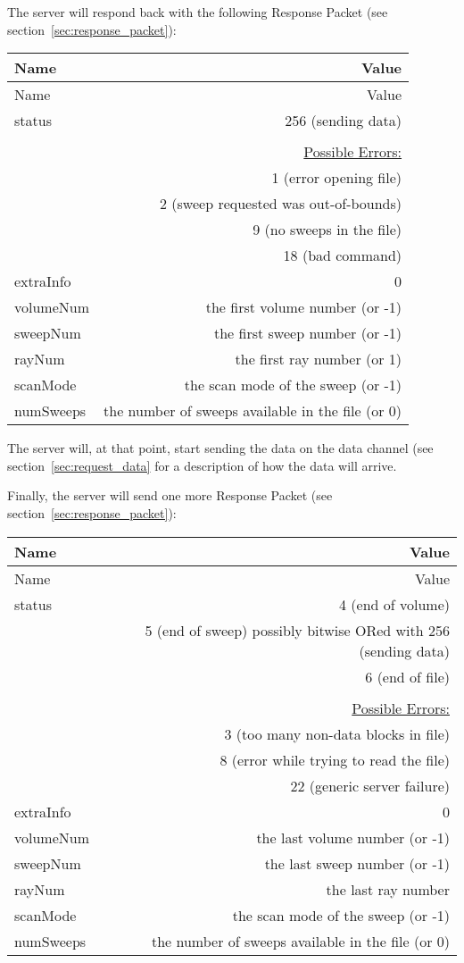 \documentclass[10pt]{article}
\newcommand{\tblspc}{\rule{0pt}{3ex}}
\begin{document}
The server will respond back with the following Response Packet (see section~\ref{sec:response_packet}):
\begin{longtable}{|l|r|}
\hline Name & Value \\ \hline \endfirsthead
\hline Name & Value \\ \hline \endhead
\hline \endfoot
\tblspc status & 256 (sending data) \\
& \\
& \underline{Possible Errors:} \\
& 1 (error opening file) \\
& 2 (sweep requested was out-of-bounds) \\
& 9 (no sweeps in the file) \\
& 18 (bad command) \\
\hline
\tblspc extraInfo & 0 \\
\hline
\tblspc volumeNum & the first volume number (or -1) \\
\hline
\tblspc sweepNum & the first sweep number (or -1) \\
\hline
\tblspc rayNum & the first ray number (or 1) \\
\hline
\tblspc scanMode & the scan mode of the sweep (or -1) \\
\hline
\tblspc numSweeps & the number of sweeps available in the file (or 0) \\
\hline
\end{longtable}

The server will, at that point, start sending the data on the data channel (see section~\ref{sec:request_data} for a description of how the data will arrive.

Finally, the server will send one more Response Packet (see section~\ref{sec:response_packet}):
\begin{longtable}{|l|r|}
\hline Name & Value \\ \hline \endfirsthead
\hline Name & Value \\ \hline \endhead
\hline \endfoot
\tblspc status & 4 (end of volume) \\
& 5 (end of sweep) possibly bitwise ORed with 256 (sending data)  \\
& 6 (end of file) \\
& \\
& \underline{Possible Errors:} \\
& 3 (too many non-data blocks in file) \\
& 8 (error while trying to read the file) \\
& 22 (generic server failure) \\
\hline
\tblspc extraInfo & 0 \\
\hline
\tblspc volumeNum & the last volume number (or -1) \\
\hline
\tblspc sweepNum & the last sweep number (or -1) \\
\hline
\tblspc rayNum & the last ray number \\
\hline
\tblspc scanMode & the scan mode of the sweep (or -1) \\
\hline
\tblspc numSweeps & the number of sweeps available in the file (or 0) \\
\hline
\end{longtable}
\end{document}
